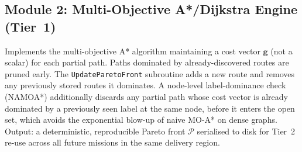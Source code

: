 \documentclass{ssnreview}
\begin{document}
\subsection{Module 2: Multi-Objective A*/Dijkstra Engine (Tier~1)}
Implements the multi-objective A* algorithm maintaining a cost vector $\mathbf{g}$ (not
a scalar) for each partial path. Paths dominated by already-discovered routes are pruned
early. The \texttt{UpdateParetoFront} subroutine adds a new route and removes any
previously stored routes it dominates. A node-level label-dominance check (NAMOA*)
additionally discards any partial path whose cost vector is already dominated by a
previously seen label at the same node, before it enters the open set, which avoids the
exponential blow-up of naive MO-A* on dense graphs. Output: a deterministic, reproducible
Pareto front $\mathcal{P}$ serialised to disk for Tier~2 re-use across all future
missions in the same delivery region.
\end{document}
